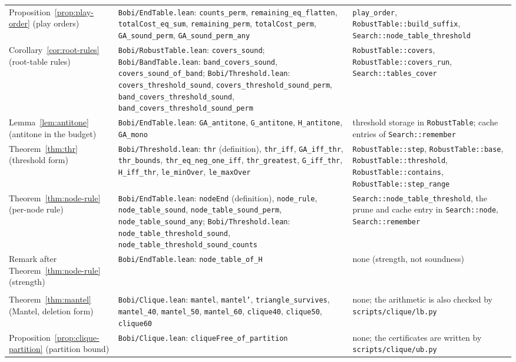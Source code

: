 {\begin{longtable}{@{}>{\raggedright\arraybackslash}p{1.3in}>{\raggedright\arraybackslash}p{2.75in}>{\raggedright\arraybackslash}p{2.0in}@{}}
Proposition~\ref{prop:play-order} (play orders) &
\texttt{Bobi/EndTable.lean}: \texttt{counts\_perm}, \texttt{remaining\_eq\_flatten}, \texttt{totalCost\_eq\_sum}, \texttt{remaining\_perm}, \texttt{totalCost\_perm}, \texttt{GA\_sound\_perm}, \texttt{GA\_sound\_perm\_any} &
\texttt{play\_order}, \texttt{RobustTable::build\_suffix}, \texttt{Search::node\_table\_threshold}\tabularnewline[3pt]
Corollary~\ref{cor:root-rules} (root-table rules) &
\texttt{Bobi/RobustTable.lean}: \texttt{covers\_sound}; \texttt{Bobi/BandTable.lean}: \texttt{band\_covers\_sound}, \texttt{covers\_sound\_of\_band}; \texttt{Bobi/Threshold.lean}: \texttt{covers\_threshold\_sound}, \texttt{covers\_threshold\_sound\_perm}, \texttt{band\_covers\_threshold\_sound}, \texttt{band\_covers\_threshold\_sound\_perm} &
\texttt{RobustTable::covers}, \texttt{RobustTable::covers\_run}, \texttt{Search::tables\_cover}\tabularnewline[3pt]
Lemma~\ref{lem:antitone} (antitone in the budget) &
\texttt{Bobi/EndTable.lean}: \texttt{GA\_antitone}, \texttt{G\_antitone}, \texttt{H\_antitone}, \texttt{GA\_mono} &
threshold storage in \texttt{RobustTable}; cache entries of \texttt{Search::remember}\tabularnewline[3pt]
Theorem~\ref{thm:thr} (threshold form) &
\texttt{Bobi/Threshold.lean}: \texttt{thr} (definition), \texttt{thr\_iff}, \texttt{GA\_iff\_thr}, \texttt{thr\_bounds}, \texttt{thr\_eq\_neg\_one\_iff}, \texttt{thr\_greatest}, \texttt{G\_iff\_thr}, \texttt{H\_iff\_thr}, \texttt{le\_minOver}, \texttt{le\_maxOver} &
\texttt{RobustTable::step}, \texttt{RobustTable::base}, \texttt{RobustTable::threshold}, \texttt{RobustTable::contains}, \texttt{RobustTable::step\_range}\tabularnewline[3pt]
Theorem~\ref{thm:node-rule} (per-node rule) &
\texttt{Bobi/EndTable.lean}: \texttt{nodeEnd} (definition), \texttt{node\_rule}, \texttt{node\_table\_sound}, \texttt{node\_table\_sound\_perm}, \texttt{node\_table\_sound\_any}; \texttt{Bobi/Threshold.lean}: \texttt{node\_table\_threshold\_sound}, \texttt{node\_table\_threshold\_sound\_counts} &
\texttt{Search::node\_table\_threshold}, the prune and cache entry in \texttt{Search::node}, \texttt{Search::remember}\tabularnewline[3pt]
Remark after Theorem~\ref{thm:node-rule} (strength) &
\texttt{Bobi/EndTable.lean}: \texttt{node\_table\_of\_H} &
none (strength, not soundness)\tabularnewline[3pt]
\addlinespace[4pt]
\multicolumn{3}{@{}l}{\emph{Edge clique interdiction (Section~\ref{app:clique})}}\tabularnewline[3pt]
Theorem~\ref{thm:mantel} (Mantel, deletion form) &
\texttt{Bobi/Clique.lean}: \texttt{mantel}, \texttt{mantel'}, \texttt{triangle\_survives}, \texttt{mantel\_40}, \texttt{mantel\_50}, \texttt{mantel\_60}, \texttt{clique40}, \texttt{clique50}, \texttt{clique60} &
none; the arithmetic is also checked by \texttt{scripts/clique/lb.py}\tabularnewline[3pt]
Proposition~\ref{prop:clique-partition} (partition bound) &
\texttt{Bobi/Clique.lean}: \texttt{cliqueFree\_of\_partition} &
none; the certificates are written by \texttt{scripts/clique/ub.py}\tabularnewline[3pt]
\end{longtable}
}

